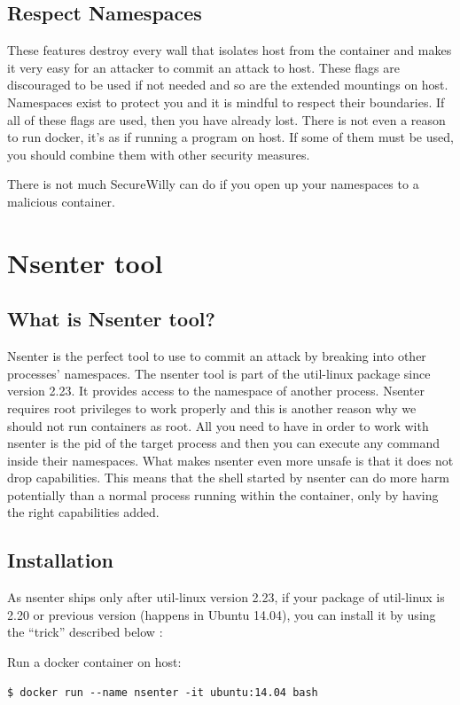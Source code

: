 \subsection{Respect Namespaces}
These features destroy every wall that isolates host from the container and makes it very easy for an attacker to commit an attack to host. These flags are discouraged to be used if not needed and so are the extended mountings on host. Namespaces exist to protect you and it is mindful to respect their boundaries. If all of these flags are used, then you have already lost. There is not even a reason to run docker, it's as if running a program on host. If some of them must be used, you should combine them with other security measures. 

There is not much SecureWilly can do if you open up your namespaces to a malicious container. 

\section{Nsenter tool}
\subsection{What is Nsenter tool?}
Nsenter is the perfect tool to use to commit an attack by breaking into other processes' namespaces. The nsenter tool is part of the util-linux package since version 2.23. It provides access to the namespace of another process. Nsenter requires root privileges to work properly and this is another reason why we should not run containers as root. All you need to have in order to work with nsenter is the pid of the target process and then you can execute any command inside their namespaces. 
What makes nsenter even more unsafe is that it does not drop capabilities. This means that the shell started by nsenter can do more harm potentially than a normal process running within the container, only by having the right capabilities added.

\subsection{Installation}
As nsenter ships only after util-linux version 2.23, if your package of util-linux is 2.20 or previous version (happens in Ubuntu 14.04), you can install it by using the “trick” described below \cite{nsentertrick} :

Run a docker container on host:
\begin{lstlisting}[style=dockercommands]
$ docker run --name nsenter -it ubuntu:14.04 bash
\end{lstlisting}

